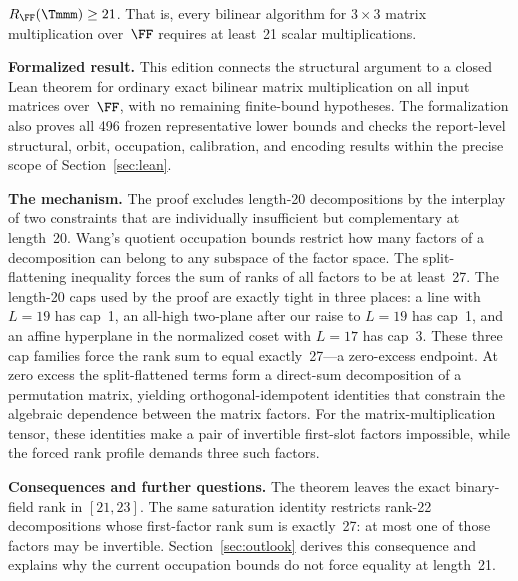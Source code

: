 \documentclass[11pt,a4paper]{article}
\begin{document}
\begin{theorem}\label{thm:main}
  $R_{\FF}(\Tmmm)\ge 21$.  That is, every bilinear algorithm for $3\times 3$ matrix multiplication over~$\FF$ requires at least~21 scalar multiplications.
\end{theorem}

\noindent\textbf{Formalized result.}\quad
This edition connects the structural argument to a closed Lean theorem
for ordinary exact bilinear matrix multiplication on all input matrices
over~$\FF$, with no remaining finite-bound hypotheses. The formalization
also proves all 496 frozen representative lower bounds and checks the
report-level structural, orbit, occupation, calibration, and encoding
results within the precise scope of Section~\ref{sec:lean}.

\noindent\textbf{The mechanism.}\quad
The proof excludes length-20 decompositions by the interplay of two constraints that are individually insufficient but complementary at length~20.  Wang's quotient occupation bounds restrict how many factors of a decomposition can belong to any subspace of the factor space.  The split-flattening inequality forces the sum of ranks of all factors to be at least~27.  The length-20 caps used by the proof are exactly tight in three places: a line with $L=19$ has cap~1, an all-high two-plane after our raise to $L=19$ has cap~1, and an affine hyperplane in the normalized coset with $L=17$ has cap~3.  These three cap families force the rank sum to equal exactly~27---a zero-excess endpoint.  At zero excess the split-flattened terms form a direct-sum decomposition of a permutation matrix, yielding orthogonal-idempotent identities that constrain the algebraic dependence between the matrix factors.  For the matrix-multiplication tensor, these identities make a pair of invertible first-slot factors impossible, while the forced rank profile demands three such factors.

\noindent\textbf{Consequences and further questions.}\quad
The theorem leaves the exact binary-field rank in $[21,23]$. The same
saturation identity restricts rank-22 decompositions whose first-factor
rank sum is exactly~27: at most one of those factors may be invertible.
Section~\ref{sec:outlook} derives this consequence and explains why the
current occupation bounds do not force equality at length~21.
\end{document}
